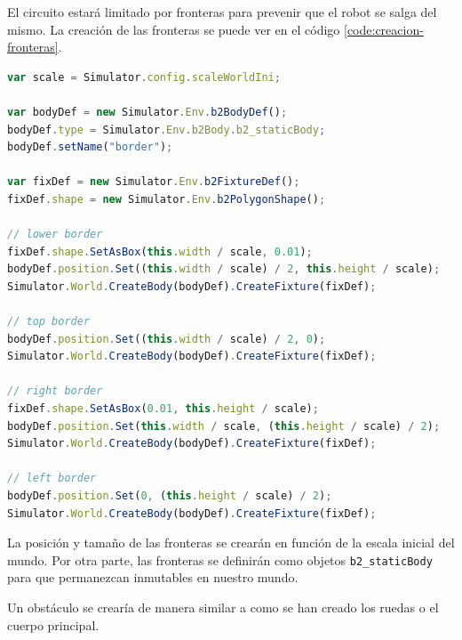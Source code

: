 El circuito estará limitado por fronteras para prevenir que el robot se salga del mismo. La creación de las fronteras se puede ver en el código \ref{code:creacion-fronteras}.

\begin{lstlisting}[language={Javascript},label={code:creacion-fronteras}, caption={Función que crea las fronteras del mundo.}]
var scale = Simulator.config.scaleWorldIni;

var bodyDef = new Simulator.Env.b2BodyDef();
bodyDef.type = Simulator.Env.b2Body.b2_staticBody;
bodyDef.setName("border");

var fixDef = new Simulator.Env.b2FixtureDef();
fixDef.shape = new Simulator.Env.b2PolygonShape();

// lower border
fixDef.shape.SetAsBox(this.width / scale, 0.01);
bodyDef.position.Set((this.width / scale) / 2, this.height / scale);
Simulator.World.CreateBody(bodyDef).CreateFixture(fixDef);

// top border
bodyDef.position.Set((this.width / scale) / 2, 0);
Simulator.World.CreateBody(bodyDef).CreateFixture(fixDef);

// right border
fixDef.shape.SetAsBox(0.01, this.height / scale);
bodyDef.position.Set(this.width / scale, (this.height / scale) / 2);
Simulator.World.CreateBody(bodyDef).CreateFixture(fixDef);

// left border
bodyDef.position.Set(0, (this.height / scale) / 2);
Simulator.World.CreateBody(bodyDef).CreateFixture(fixDef);
\end{lstlisting}

La posición y tamaño de las fronteras se crearán en función de la escala inicial del mundo. Por otra parte, las fronteras se definirán como objetos \texttt{b2\_staticBody} para que permanezcan inmutables en nuestro mundo.

Un obstáculo se crearía de manera similar a como se han creado los ruedas o el cuerpo principal.

